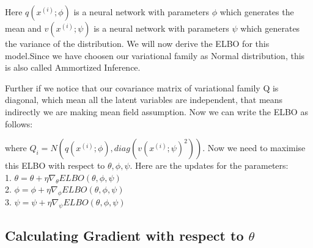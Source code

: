 \documentclass[10pt,a4paper,twoside]{tau-book}
\begin{document}
Here $q(x^{(i)};\phi)$ is a neural network with parameters $\phi$ which generates the mean and $v(x^{(i)};\psi)$ is a neural network with parameters $\psi$ which generates the variance of the distribution. We will now derive the ELBO for this model.Since we have choosen our variational family as Normal distribution, this is also called Ammortized Inference.

Further if we notice that our covariance matrix of variational family Q is diagonal, which mean all the latent variables are independent, that means indirectly we are making mean field assumption. Now we can write the ELBO as follows:

 where $Q_i = N(q(x^{(i)};\phi), diag(v(x^{(i)};\psi)^2))$. Now we need to maximise this ELBO with respect to $\theta,\phi,\psi$. Here are the updates for the parameters:\\
1. $\theta = \theta + \eta \nabla_{\theta} ELBO(\theta,\phi,\psi)$\\
2. $\phi = \phi + \eta \nabla_{\phi} ELBO(\theta,\phi,\psi)$\\
3. $\psi = \psi + \eta \nabla_{\psi} ELBO(\theta,\phi,\psi)$

\subsection{Calculating Gradient with respect to $\theta$}
\end{document}
